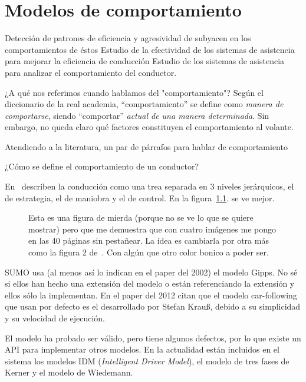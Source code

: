 \chapter{Modelos de comportamiento}
\label{ch:sota-behavior-models}

Detección de patrones de eficiencia y agresividad de subyacen en los comportamientos de éstos
Estudio de la efectividad de los sistemas de asistencia para mejorar la eficiencia de conducción
Estudio de los sistemas de asistencia para analizar el comportamiento del conductor.

¿A qué nos referimos cuando hablamos del "comportamiento"? Según el diccionario de la real academia, \enquote{comportamiento} se define como \textit{manera de comportarse}, siendo \enquote{comportar} \textit{actual de una manera determinada}. Sin embargo, no queda claro qué factores constituyen el comportamiento al volante.

Atendiendo a la literatura, \TODO un par de párrafos para hablar de comportamiento

¿Cómo se define el comportamiento de un conductor?

En~\cite{michon1985critical} describen la conducción como una trea separada en $3$ niveles jerárquicos, el de estrategia, el de maniobra y el de control. En la figura~\ref{fig:three-levels-of-human-driving}. se ve mejor.
\begin{figure}
	\centering
{}
	\caption{Esta es una figura de mierda (porque no se ve lo que se quiere mostrar) pero que me demuestra que con cuatro imágenes me pongo en las 40 páginas sin pestañear. La idea es cambiarla por otra más como la figura 2 de~\cite{michon1985critical}. Con algún que otro color bonico a poder ser.}
	\label{fig:three-levels-of-human-driving}
\end{figure}

SUMO usa (al menos así lo indican en el paper del 2002) el modelo Gipps\cite{krajzewicz2002sumo}. No sé si ellos han hecho una extensión del modelo o están referenciando la extensión y ellos sólo la implementan. En el paper del 2012 citan que el modelo car-following que usan por defecto es el desarrollado por Stefan Krauß\cite{jin2016evaluation}, debido a su simplicidad y su velocidad de ejecución.

El modelo ha probado ser válido, pero tiene algunos defectos, por lo que existe un API para implementar otros modelos. En la actualidad están incluidos en el sistema los modelos IDM\cite{treiber2000congested} (\textit{Intelligent Driver Model}), el modelo de tres fases de Kerner\cite{kerner2008testbed} y el modelo de Wiedemann\cite{wiedemann1974simulation}.

